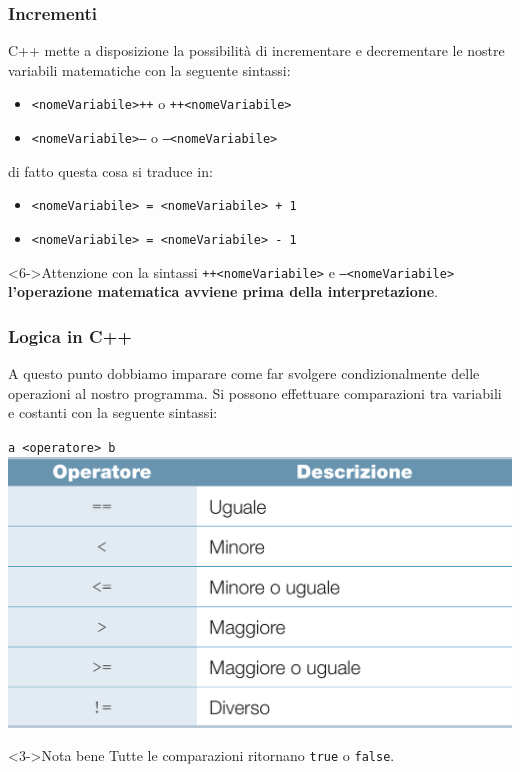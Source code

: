 \documentclass[handout]{beamer}
\begin{document}
    \begin{frame}
        \frametitle{Incrementi}
        C++ mette a disposizione la possibilità di incrementare e decrementare le nostre variabili matematiche con la seguente sintassi:
        \begin{itemize}
            \item<2-> \texttt{<nomeVariabile>++} o \texttt{++<nomeVariabile>}
            \item<3-> \texttt{<nomeVariabile>--} o \texttt{--<nomeVariabile>}
        \end{itemize}
         di fatto questa cosa si traduce in:
        \begin{itemize}
            \item<4-> \texttt{<nomeVariabile> = <nomeVariabile> + 1} 
            \item<5-> \texttt{<nomeVariabile> = <nomeVariabile> - 1} 
        \end{itemize}
        
        \begin{block}<6->{Attenzione}
            con la sintassi \texttt{++<nomeVariabile>} e \texttt{--<nomeVariabile>} \textbf{l'operazione matematica avviene prima della interpretazione}.
        \end{block}
    \end{frame}

    \begin{frame}[fragile]
        \frametitle{Logica in C++}
        A questo punto dobbiamo imparare come far svolgere condizionalmente delle operazioni al nostro programma. Si possono effettuare comparazioni tra variabili e costanti con la seguente sintassi:
        \begin{center}
            \Large{\texttt{a <operatore> b}} \\
             \includegraphics[scale=0.13]{img/logic_operators.png}
        \end{center}
        \begin{block}<3->{Nota bene}
            Tutte le comparazioni ritornano \texttt{true} o \texttt{false}.
        \end{block}
    \end{frame}
\end{document}
